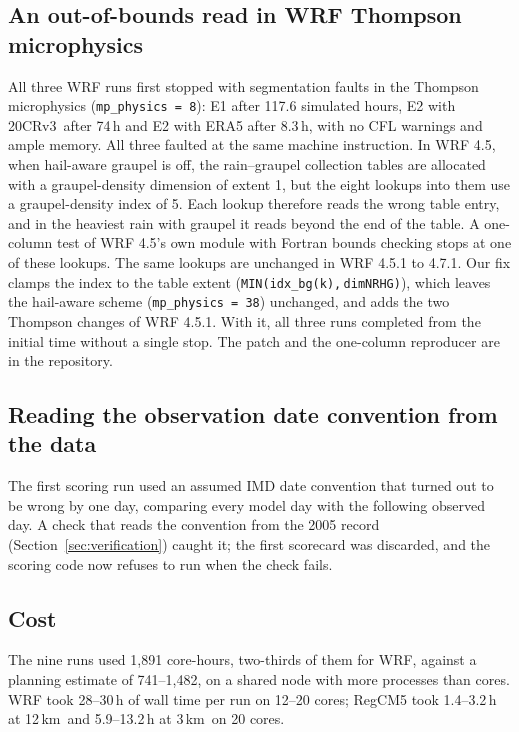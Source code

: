 \documentclass[11pt,a4paper]{article}
\newcommand{\twcr}{20CRv3}
\newcommand{\km}{\,km}
\begin{document}
\subsection{An out-of-bounds read in WRF Thompson microphysics}
\label{sec:thompson}

All three WRF runs first stopped with segmentation faults in the Thompson
microphysics (\texttt{mp\_physics\,=\,8}): E1 after 117.6 simulated hours, E2 with \twcr\ after 74\,h and
E2 with ERA5 after 8.3\,h, with no CFL warnings and ample memory. All three faulted at the
same machine instruction. In WRF 4.5, when hail-aware graupel is off, the rain--graupel
collection tables are allocated with a graupel-density dimension of extent 1, but the eight
lookups into them use a graupel-density index of 5. Each lookup therefore reads the wrong
table entry, and in the heaviest rain with graupel it reads beyond the end of the table.
A one-column test of WRF 4.5's own module with Fortran bounds checking stops at one of these
lookups. The same lookups are unchanged in WRF 4.5.1 to 4.7.1. Our fix clamps the
index to the table extent (\texttt{MIN(idx\_bg(k),}\linebreak[0]\,\texttt{dimNRHG)}), which leaves the hail-aware
scheme (\texttt{mp\_physics\,=\,38}) unchanged, and adds the two Thompson changes of WRF 4.5.1.
With it, all three runs completed from the initial time without a single stop. The patch and
the one-column reproducer are in the repository.

\subsection{Reading the observation date convention from the data}

The first scoring run used an assumed IMD date convention that turned out to be wrong by
one day, comparing every model day with the following observed day. A check that reads the
convention from the 2005 record (Section~\ref{sec:verification}) caught it; the first
scorecard was discarded, and the scoring code now refuses to run when the check fails.

\subsection{Cost}

The nine runs used 1{,}891 core-hours, two-thirds of them for WRF, against a planning
estimate of 741--1{,}482, on a shared node with more processes than cores. WRF took
28--30\,h of wall time per run on 12--20 cores; RegCM5 took 1.4--3.2\,h at 12\km\ and
5.9--13.2\,h at 3\km\ on 20 cores.
\end{document}

